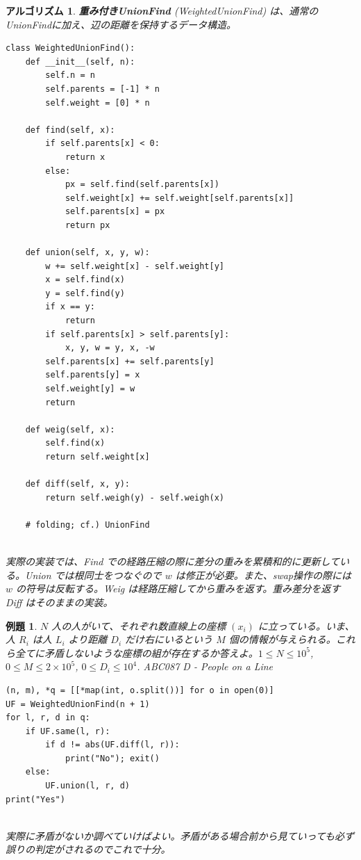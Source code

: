 \documentclass[12pt, a4j]{ltjsarticle}
\newtheorem{alg}[thm]{アルゴリズム}
\newtheorem{exm}[thm]{例題}
\newcommand*{\SS}{\vspace{1cm}}
\begin{document}
\begin{alg} {\bf 重み付きUnionFind} (WeightedUnionFind) は、\upshape 通常のUnionFindに加え、辺の距離を保持するデータ構造。\\
\begin{lstlisting}
class WeightedUnionFind():
    def __init__(self, n):
        self.n = n
        self.parents = [-1] * n
        self.weight = [0] * n

    def find(self, x):
        if self.parents[x] < 0:
            return x
        else:
            px = self.find(self.parents[x])
            self.weight[x] += self.weight[self.parents[x]]
            self.parents[x] = px
            return px

    def union(self, x, y, w):
        w += self.weight[x] - self.weight[y]
        x = self.find(x)
        y = self.find(y)
        if x == y:
            return
        if self.parents[x] > self.parents[y]:
            x, y, w = y, x, -w
        self.parents[x] += self.parents[y]
        self.parents[y] = x
        self.weight[y] = w
        return

    def weig(self, x):
        self.find(x)
        return self.weight[x]

    def diff(self, x, y):
        return self.weigh(y) - self.weigh(x)

    # folding; cf.) UnionFind
\end{lstlisting}\quad\\
実際の実装では、Find での経路圧縮の際に差分の重みを累積和的に更新している。Union では根同士をつなぐので $w$ は修正が必要。また、swap操作の際には $w$ の符号は反転する。Weig は経路圧縮してから重みを返す。重み差分を返す Diff はそのままの実装。
\end{alg}

\SS

\begin{exm}
$N$ 人の人がいて、それぞれ数直線上の座標 $(x_i)$ に立っている。いま、人 $R_i$ は人 $L_i$ より距離 $D_i$ だけ右にいるという $M$ 個の情報が与えられる。これら全てに矛盾しないような座標の組が存在するか答えよ。$1\le N\le 10^5$, $0\le M\le 2\times 10^5$, $0\le D_i \le 10^4$. \quad\upshape ABC087 D - People on a Line\\
\begin{lstlisting}
(n, m), *q = [[*map(int, o.split())] for o in open(0)]
UF = WeightedUnionFind(n + 1)
for l, r, d in q:
    if UF.same(l, r):
        if d != abs(UF.diff(l, r)):
            print("No"); exit()
    else:
        UF.union(l, r, d)
print("Yes")
\end{lstlisting}\quad\\
実際に矛盾がないか調べていけばよい。矛盾がある場合前から見ていっても必ず誤りの判定がされるのでこれで十分。
\end{exm}
\end{document}

